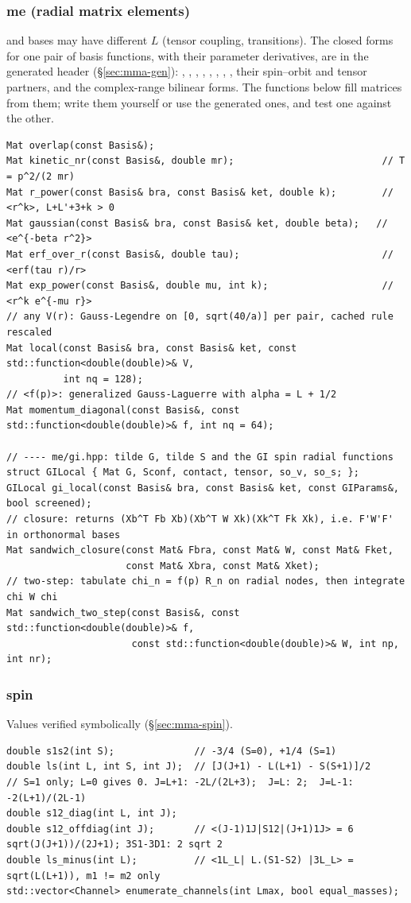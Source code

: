 \documentclass[11pt,a4paper]{article}
\numberwithin{equation}{section}
\theoremstyle{definition}
\theoremstyle{plain}
\theoremstyle{remark}
\numberwithin{algorithm}{section}
\begin{document}
\subsubsection*{me (radial matrix elements)}
 and  bases may have different $L$ (tensor coupling, transitions). The closed forms for one pair of basis functions, with their parameter derivatives, are in the generated header  (\S\ref{sec:mma-gen}): , , , , , , , , their spin--orbit and tensor partners, and the complex-range bilinear forms. The functions below fill matrices from them; write them yourself or use the generated ones, and test one against the other.
\begin{lstlisting}[style=cpp]
Mat overlap(const Basis&);
Mat kinetic_nr(const Basis&, double mr);                          // T = p^2/(2 mr)
Mat r_power(const Basis& bra, const Basis& ket, double k);        // <r^k>, L+L'+3+k > 0
Mat gaussian(const Basis& bra, const Basis& ket, double beta);   // <e^{-beta r^2}>
Mat erf_over_r(const Basis&, double tau);                         // <erf(tau r)/r>
Mat exp_power(const Basis&, double mu, int k);                    // <r^k e^{-mu r}>
// any V(r): Gauss-Legendre on [0, sqrt(40/a)] per pair, cached rule rescaled
Mat local(const Basis& bra, const Basis& ket, const std::function<double(double)>& V,
          int nq = 128);
// <f(p)>: generalized Gauss-Laguerre with alpha = L + 1/2
Mat momentum_diagonal(const Basis&, const std::function<double(double)>& f, int nq = 64);

// ---- me/gi.hpp: tilde G, tilde S and the GI spin radial functions
struct GILocal { Mat G, Sconf, contact, tensor, so_v, so_s; };
GILocal gi_local(const Basis& bra, const Basis& ket, const GIParams&, bool screened);
// closure: returns (Xb^T Fb Xb)(Xb^T W Xk)(Xk^T Fk Xk), i.e. F'W'F' in orthonormal bases
Mat sandwich_closure(const Mat& Fbra, const Mat& W, const Mat& Fket,
                     const Mat& Xbra, const Mat& Xket);
// two-step: tabulate chi_n = f(p) R_n on radial nodes, then integrate chi W chi
Mat sandwich_two_step(const Basis&, const std::function<double(double)>& f,
                      const std::function<double(double)>& W, int np, int nr);
\end{lstlisting}

\subsubsection*{spin}
Values verified symbolically (\S\ref{sec:mma-spin}).
\begin{lstlisting}[style=cpp]
double s1s2(int S);              // -3/4 (S=0), +1/4 (S=1)
double ls(int L, int S, int J);  // [J(J+1) - L(L+1) - S(S+1)]/2
// S=1 only; L=0 gives 0. J=L+1: -2L/(2L+3);  J=L: 2;  J=L-1: -2(L+1)/(2L-1)
double s12_diag(int L, int J);
double s12_offdiag(int J);       // <(J-1)1J|S12|(J+1)1J> = 6 sqrt(J(J+1))/(2J+1); 3S1-3D1: 2 sqrt 2
double ls_minus(int L);          // <1L_L| L.(S1-S2) |3L_L> = sqrt(L(L+1)), m1 != m2 only
std::vector<Channel> enumerate_channels(int Lmax, bool equal_masses);
\end{lstlisting}
\end{document}
